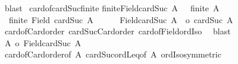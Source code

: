 \begin{isabellebody}
\ blast\isanewline
{}\isamarkupfalse%
%
\endisatagproof
{\isafoldproof}%
%
\isadelimproof
\isanewline
%
\endisadelimproof
\isanewline
{}\isamarkupfalse%
\ card{\isacharunderscore}{\kern0pt}of{\isacharunderscore}{\kern0pt}cardSuc{\isacharunderscore}{\kern0pt}finite{\isacharcolon}{\kern0pt}\isanewline
{\isachardoublequoteopen}finite{\isacharparenleft}{\kern0pt}Field{\isacharparenleft}{\kern0pt}cardSuc\ {\isacharbar}{\kern0pt}A{\isacharbar}{\kern0pt}\ {\isacharparenright}{\kern0pt}{\isacharparenright}{\kern0pt}\ {\isacharequal}{\kern0pt}\ finite\ A{\isachardoublequoteclose}\isanewline
%
\isadelimproof
%
\endisadelimproof
%
\isatagproof
{}\isamarkupfalse%
\isanewline
\ \ \isamarkupfalse%
\ {\isacharasterisk}{\kern0pt}{\isacharcolon}{\kern0pt}\ {\isachardoublequoteopen}finite\ {\isacharparenleft}{\kern0pt}Field\ {\isacharparenleft}{\kern0pt}cardSuc\ {\isacharbar}{\kern0pt}A{\isacharbar}{\kern0pt}\ {\isacharparenright}{\kern0pt}{\isacharparenright}{\kern0pt}{\isachardoublequoteclose}\isanewline
\ \ \isamarkupfalse%
\ {}{\isacharcolon}{\kern0pt}\ {\isachardoublequoteopen}{\isacharbar}{\kern0pt}Field{\isacharparenleft}{\kern0pt}cardSuc\ {\isacharbar}{\kern0pt}A{\isacharbar}{\kern0pt}\ {\isacharparenright}{\kern0pt}{\isacharbar}{\kern0pt}\ {\isacharequal}{\kern0pt}o\ cardSuc\ {\isacharbar}{\kern0pt}A{\isacharbar}{\kern0pt}{\isachardoublequoteclose}\isanewline
\ \ \isamarkupfalse%
\ card{\isacharunderscore}{\kern0pt}of{\isacharunderscore}{\kern0pt}Card{\isacharunderscore}{\kern0pt}order\ cardSuc{\isacharunderscore}{\kern0pt}Card{\isacharunderscore}{\kern0pt}order\ card{\isacharunderscore}{\kern0pt}of{\isacharunderscore}{\kern0pt}Field{\isacharunderscore}{\kern0pt}ordIso\ \isamarkupfalse%
\ blast\isanewline
\ \ \isamarkupfalse%
\ {\isachardoublequoteopen}{\isacharbar}{\kern0pt}A{\isacharbar}{\kern0pt}\ {\isasymle}o\ {\isacharbar}{\kern0pt}Field{\isacharparenleft}{\kern0pt}cardSuc\ {\isacharbar}{\kern0pt}A{\isacharbar}{\kern0pt}\ {\isacharparenright}{\kern0pt}{\isacharbar}{\kern0pt}{\isachardoublequoteclose}\isanewline
\ \ \isamarkupfalse%
\ card{\isacharunderscore}{\kern0pt}of{\isacharunderscore}{\kern0pt}Card{\isacharunderscore}{\kern0pt}order{\isacharbrackleft}{\kern0pt}of\ A{\isacharbrackright}{\kern0pt}\ cardSuc{\isacharunderscore}{\kern0pt}ordLeq{\isacharbrackleft}{\kern0pt}of\ {\isachardoublequoteopen}{\isacharbar}{\kern0pt}A{\isacharbar}{\kern0pt}{\isachardoublequoteclose}{\isacharbrackright}{\kern0pt}\ ordIso{\isacharunderscore}{\kern0pt}symmetric\isanewline

\end{isabellebody}
